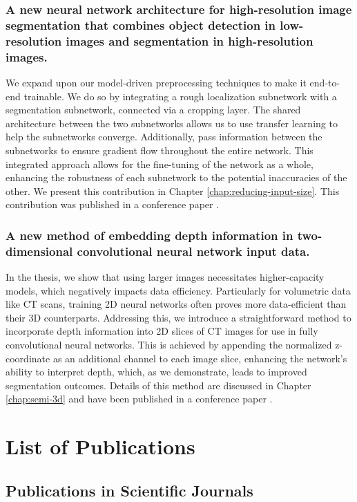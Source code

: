 \subsubsection{A new neural network architecture for high-resolution image segmentation that combines object detection in low-resolution images and segmentation in high-resolution images.}

We expand upon our model-driven preprocessing techniques to make it end-to-end trainable. We do so by integrating a rough localization subnetwork with a segmentation subnetwork, connected via a cropping layer. The shared architecture between the two subnetworks allows us to use transfer learning to help the subnetworks converge. Additionally, pass information between the subnetworks to ensure gradient flow throughout the entire network. This integrated approach allows for the fine-tuning of the network as a whole, enhancing the robustness of each subnetwork to the potential inaccuracies of the other. We present this contribution in Chapter \ref{chap:reducing-input-size}. This contribution was published in a conference paper .

\subsubsection{A new method of embedding depth information in two-dimensional convolutional neural network input data.}

In the thesis, we show that using larger images necessitates higher-capacity models, which negatively impacts data efficiency. Particularly for volumetric data like CT scans, training 2D neural networks often proves more data-efficient than their 3D counterparts. Addressing this, we introduce a straightforward method to incorporate depth information into 2D slices of CT images for use in fully convolutional neural networks. This is achieved by appending the normalized z-coordinate as an additional channel to each image slice, enhancing the network's ability to interpret depth, which, as we demonstrate, leads to improved segmentation outcomes. Details of this method are discussed in Chapter \ref{chap:semi-3d} and have been published in a conference paper \cite{bencevicEpicardialAdiposeTissue2021}.

\section{List of Publications}

\subsection{Publications in Scientific Journals}

